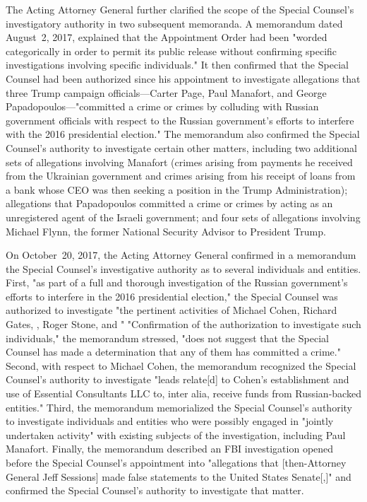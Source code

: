 The Acting Attorney General further clarified the scope of the Special Counsel's investigatory authority in two subsequent memoranda.
A memorandum dated August~2, 2017, explained that the Appointment Order had been "worded categorically in order to permit its public release without confirming specific investigations involving specific individuals."
It then confirmed that the Special Counsel had been authorized since his appointment to investigate allegations that three Trump campaign officials---Carter Page, Paul Manafort, and George Papadopoulos---"committed a crime or crimes by colluding with Russian government officials with respect to the Russian government's efforts to interfere with the 2016 presidential election."
The memorandum also confirmed the Special Counsel's authority to investigate certain other matters, including two additional sets of allegations involving Manafort (crimes arising from payments he received from the Ukrainian government and crimes arising from his receipt of loans from a bank whose CEO was then seeking a position in the Trump Administration); allegations that Papadopoulos committed a crime or crimes by acting as an unregistered agent of the Israeli government; and four sets of allegations involving Michael Flynn, the former National Security Advisor to President Trump.

On October~20, 2017, the Acting Attorney General confirmed in a memorandum the Special Counsel's investigative authority as to several individuals and entities.
First, "as part of a full and thorough investigation of the Russian government's efforts to interfere in the 2016 presidential election," the Special Counsel was authorized to investigate "the pertinent activities of Michael Cohen, Richard Gates, , Roger Stone, and " "Confirmation of the authorization to investigate such individuals," the memorandum stressed, "does not suggest that the Special Counsel has made a determination that any of them has committed a crime."
Second, with respect to Michael Cohen, the memorandum recognized the Special Counsel's authority to investigate "leads relate[d] to Cohen's establishment and use of Essential Consultants LLC to, inter alia, receive funds from Russian-backed entities."
Third, the memorandum memorialized the Special Counsel's authority to investigate individuals and entities who were possibly engaged in "jointly undertaken activity" with existing subjects of the investigation, including Paul Manafort.
Finally, the memorandum described an FBI investigation opened before the Special Counsel's appointment into "allegations that [then-Attorney General Jeff Sessions] made false statements to the United States Senate[,]" and confirmed the Special Counsel's authority to investigate that matter.

